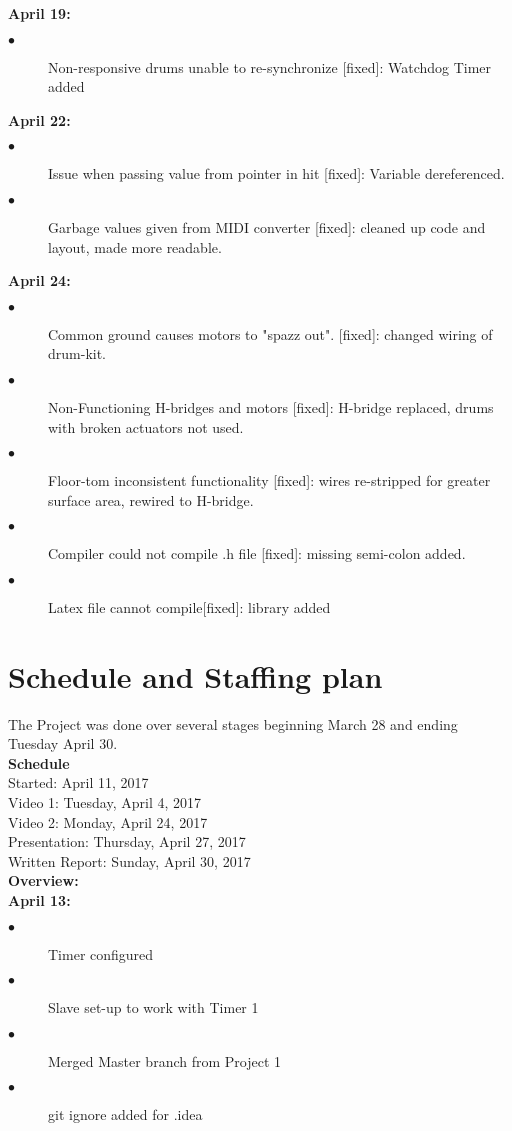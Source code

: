 \documentclass[]{article}
\begin{document}
\textbf{April 19:}
\begin{description}
	\item[$\bullet$] Non-responsive drums unable to re-synchronize [fixed]: Watchdog Timer added
\end{description}
\textbf{April 22:}
\begin{description}
	\item[$\bullet$] Issue when passing value from pointer in hit [fixed]: Variable dereferenced. 
	\item[$\bullet$] Garbage values given from MIDI converter [fixed]: cleaned up code and layout, made more readable.
\end{description}
\textbf{April 24:} 
\begin{description}
	\item[$\bullet$] Common ground causes motors to "spazz out". [fixed]: changed wiring of drum-kit.
	\item[$\bullet$] Non-Functioning H-bridges and motors [fixed]: H-bridge replaced, drums with broken actuators not used.
	\item[$\bullet$] Floor-tom inconsistent functionality [fixed]: wires re-stripped for greater surface area, rewired to H-bridge.
	\item[$\bullet$] Compiler could not compile .h file [fixed]: missing semi-colon added.
	\item[$\bullet$] Latex file cannot compile[fixed]: library added
\end{description}
	
\section{Schedule and Staffing plan}
	The Project was done over several stages beginning March 28 and ending Tuesday April 30.\\
	\textbf{Schedule}\\
	\indent Started: April 11, 2017\\
	\indent Video 1: Tuesday, April 4, 2017\\
	\indent Video 2: Monday, April 24, 2017\\
	\indent Presentation: Thursday, April 27, 2017\\
	\indent Written Report: Sunday, April 30, 2017\\[1em]
	\textbf{Overview:}\\
	
\textbf{April 13:}
	\begin{description}
		\item[$\bullet$] Timer configured
		\item[$\bullet$] Slave set-up to work with Timer 1
		\item[$\bullet$] Merged Master branch from Project 1
		\item[$\bullet$] git ignore added for .idea
	\end{description}
	
\end{document}
